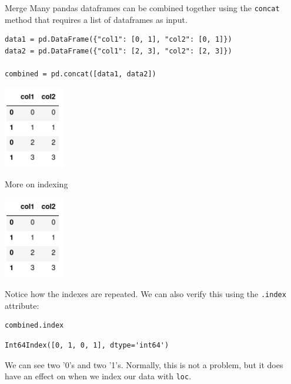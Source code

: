 \documentclass[10pt]{beamer}
\begin{document}
\begin{frame}[label={sec:org2b76f4b},fragile]{Merge}
 Many pandas dataframes can be combined together using the \texttt{concat} method that
requires a list of dataframes as input.

\begin{verbatim}
data1 = pd.DataFrame({"col1": [0, 1], "col2": [0, 1]})
data2 = pd.DataFrame({"col1": [2, 3], "col2": [2, 3]})

combined = pd.concat([data1, data2])
\end{verbatim}

\begin{center}
\includegraphics[width=0.2\textwidth]{images/combined.png}
\end{center}
\end{frame}

\begin{frame}[label={sec:org3ccdbab},fragile]{More on indexing}
 \begin{center}
\includegraphics[width=0.2\textwidth]{images/combined.png}
\end{center}

Notice how the indexes are repeated. We can also verify this using the \texttt{.index}
attribute:

\begin{verbatim}
combined.index
\end{verbatim}

\begin{verbatim}
Int64Index([0, 1, 0, 1], dtype='int64')
\end{verbatim}

We can see two '0's and two '1's. Normally, this is not a problem, but it does
have an effect on when we index our data with \texttt{loc}.
\end{frame}
\end{document}
